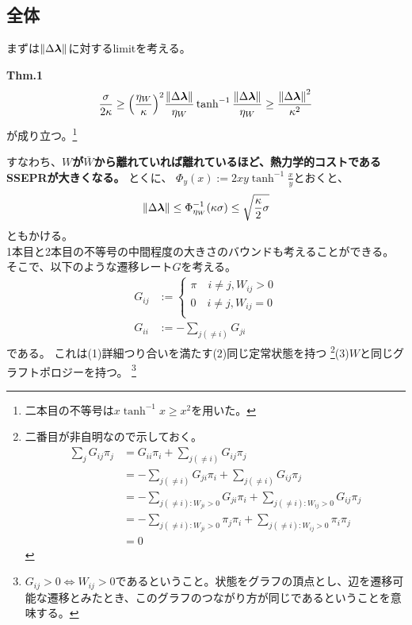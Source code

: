 \documentclass[a4paper,11pt]{jsarticle}
\numberwithin{equation}{section}
\begin{document}
\subsection{全体}
まずは$\norm{\Delta \bm{\lambda}}$に対するlimitを考える。
\begin{itembox}[l]{\textbf{Thm.1}}
    \begin{align}
        \frac{\sigma}{2\kappa} \geq \qty(\frac{\eta_{W}}{\kappa})^2 \frac{\norm{\Delta \bm{\lambda}}}{\eta_{W}}\tanh^{-1}\frac{\norm{\Delta \bm{\lambda}}}{\eta_{W}} \geq \frac{\norm{\Delta \bm{\lambda}}^2}{\kappa^2} \label{eq:thm1}
    \end{align}
    が成り立つ。\footnote{二本目の不等号は$x\tanh^{-1}x \geq x^2$を用いた。}
\end{itembox}
すなわち、\textbf{$W$が$\bar{W}$から離れていれば離れているほど、熱力学的コストであるSSEPRが大きくなる。}
とくに、
$\Phi_{y}(x) :=  2xy\tanh^{-1} \frac{x}{y}$とおくと、
\begin{align}
    \norm{\Delta \bm{\lambda}} \leq \Phi_{\eta_{W}}^{-1}(\kappa \sigma) \leq \sqrt{\frac{\kappa}{2} \sigma}
\end{align}
ともかける。\\

1本目と2本目の不等号の中間程度の大きさのバウンドも考えることができる。
そこで、以下のような遷移レート$G$を考える。
\begin{align}
    G_{ij} &:= 
    \begin{cases}
        \pi \quad i \neq j, W_{ij} > 0\\
        0 \quad i \neq j, W_{ij} = 0\\
    \end{cases}
    \\
    G_{ii} &:= -\sum_{j(\neq i)} G_{ji}
\end{align}
である。
これは(1)詳細つり合いを満たす(2)同じ定常状態を持つ
\footnote{
    二番目が非自明なので示しておく。
    \begin{align}
        \sum_{j}G_{ij} \pi_j &= G_{ii} \pi_i + \sum_{j(\neq i)} G_{ij} \pi_j\\
        &= -\sum_{j(\neq i)} G_{ji} \pi_i + \sum_{j(\neq i)} G_{ij} \pi_j\\
        &= -\sum_{j(\neq i): W_{ji} > 0} G_{ji} \pi_i + \sum_{j(\neq i): W_{ij} > 0} G_{ij} \pi_j\\
        &= -\sum_{j(\neq i): W_{ji} > 0} \pi_j \pi_i + \sum_{j(\neq i): W_{ij} > 0} \pi_i \pi_j\\
        &= 0
    \end{align}
}(3)$W$と同じグラフトポロジーを持つ。
\footnote{
    $G_{ij} > 0 \Leftrightarrow W_{ij} > 0$であるということ。状態をグラフの頂点とし、辺を遷移可能な遷移とみたとき、このグラフのつながり方が同じであるということを意味する。
}
\end{document}
